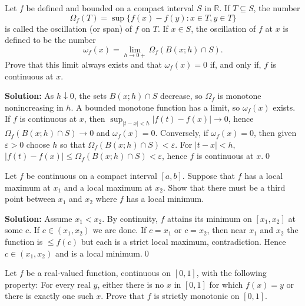 \begin{problembox}
Let \( f \) be defined and bounded on a compact interval \( S \) in \( \mathbb{R} \). If \( T \subseteq S \), the number
\[\Omega_f(T) = \sup \{f(x) - f(y) : x \in T, y \in T\}\]
is called the oscillation (or span) of \( f \) on \( T \). If \( x \in S \), the oscillation of \( f \) at \( x \) is defined to be the number
\[\omega_f(x) = \lim_{h \to 0+} \Omega_f(B(x; h) \cap S).\]
Prove that this limit always exists and that \( \omega_f(x) = 0 \) if, and only if, \( f \) is continuous at \( x \).
\end{problembox}

\noindent\textbf{Solution:}
As $h\downarrow 0$, the sets $B(x;h)\cap S$ decrease, so $\Omega_f$ is monotone nonincreasing in $h$. A bounded monotone function has a limit, so $\omega_f(x)$ exists. If $f$ is continuous at $x$, then $\sup_{|t-x|<h}|f(t)-f(x)|\to 0$, hence $\Omega_f(B(x;h)\cap S)\to 0$ and $\omega_f(x)=0$. Conversely, if $\omega_f(x)=0$, then given $\varepsilon>0$ choose $h$ so that $\Omega_f(B(x;h)\cap S)<\varepsilon$. For $|t-x|<h$, $|f(t)-f(x)|\le \Omega_f(B(x;h)\cap S)<\varepsilon$, hence $f$ is continuous at $x$.\qed



\begin{problembox}
Let \( f \) be continuous on a compact interval \([a, b]\). Suppose that \( f \) has a local maximum at \( x_1 \) and a local maximum at \( x_2 \). Show that there must be a third point between \( x_1 \) and \( x_2 \) where \( f \) has a local minimum.
\end{problembox}

\noindent\textbf{Solution:}
Assume $x_1<x_2$. By continuity, $f$ attains its minimum on $[x_1,x_2]$ at some $c$. If $c\in(x_1,x_2)$ we are done. If $c=x_1$ or $c=x_2$, then near $x_1$ and $x_2$ the function is $\le f(c)$ but each is a strict local maximum, contradiction. Hence $c\in(x_1,x_2)$ and is a local minimum.\qed



\begin{problembox}
Let \( f \) be a real-valued function, continuous on \([0, 1]\), with the following property: For every real \( y \), either there is no \( x \) in \([0, 1]\) for which \( f(x) = y \) or there is exactly one such \( x \). Prove that \( f \) is strictly monotonic on \([0, 1]\).
\end{problembox}

